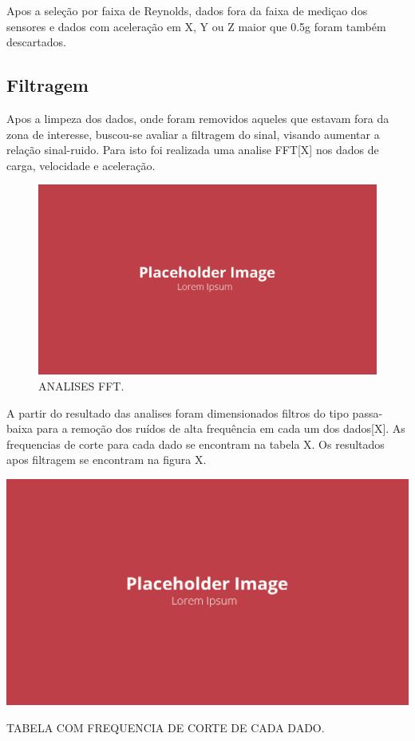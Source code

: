 Apos a seleção por faixa de Reynolds, dados fora da faixa de mediçao dos sensores e dados com aceleração em X, Y ou Z maior que 0.5g foram também descartados.

\subsection{Filtragem}

Apos a limpeza dos dados, onde foram removidos aqueles que estavam fora da zona de interesse, buscou-se avaliar a filtragem do sinal, visando aumentar a relação sinal-ruido. Para isto foi realizada uma analise FFT[X] nos dados de carga, velocidade e aceleração.

\begin{figure}[!ht]
    \centering
    \includegraphics[width=.8\linewidth]{figuras/outras/placeholder.png}
    \caption{ANALISES FFT\cite{autor}.}
    \label{fig:fft_analysis}
\end{figure}

A partir do resultado das analises foram dimensionados filtros do tipo passa-baixa para a remoção dos ruídos de alta frequência em cada um dos dados[X]. As frequencias de corte para cada dado se encontram na tabela X. Os resultados apos filtragem se encontram na figura X.

\begin{table}[!ht]
    \centering
    \includegraphics[width=.8\linewidth]{figuras/outras/placeholder.png}
    \caption{TABELA COM FREQUENCIA DE CORTE DE CADA DADO\cite{autor}.}
    \label{tab:cut_frequency_values}
\end{table}

